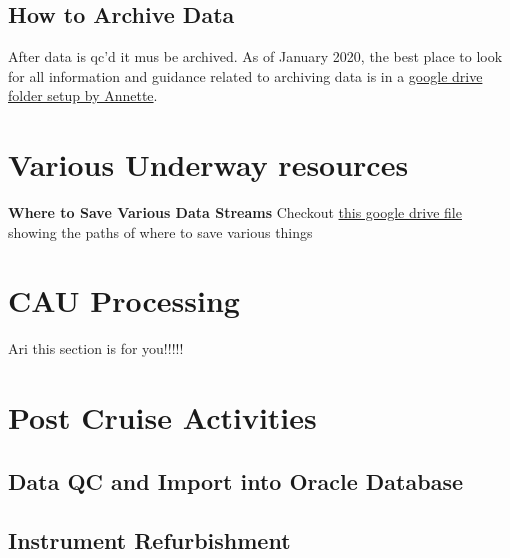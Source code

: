\documentclass[]{book}
\begin{document}
\hypertarget{how-to-archive-data}{%
\section{How to Archive Data}\label{how-to-archive-data}}

After data is qc'd it mus be archived. As of January 2020, the best place to look for all information and guidance related to archiving data is in a \href{https://drive.google.com/drive/folders/1Oq76hN6eOhhJOevwZiO0nX4Gtf0tiJrp}{google drive folder setup by Annette}.

\hypertarget{various-underway-resources}{%
\chapter{Various Underway resources}\label{various-underway-resources}}

\textbf{Where to Save Various Data Streams}
Checkout \href{https://docs.google.com/spreadsheets/d/16l1OQgGEunLoADh_MEGyIfbQL2w0u6aw/edit\#gid=1675337307}{this google drive file} showing the paths of where to save various things

\hypertarget{cau}{%
\chapter{CAU Processing}\label{cau}}

Ari this section is for you!!!!!

\hypertarget{postcruise}{%
\chapter{Post Cruise Activities}\label{postcruise}}

\hypertarget{data-qc-and-import-into-oracle-database}{%
\section{Data QC and Import into Oracle Database}\label{data-qc-and-import-into-oracle-database}}

\hypertarget{instrument-refurbishment}{%
\section{Instrument Refurbishment}\label{instrument-refurbishment}}
\end{document}
